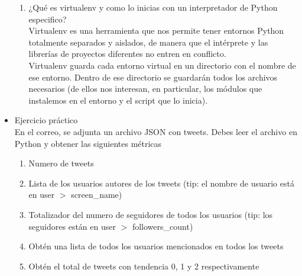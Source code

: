 \documentclass[a4paper,openright,12pt]{report}
\begin{document}
\begin{itemize}
\begin{enumerate}
			\item ¿Qué es virtualenv y como lo inicias con un interpretador de Python especifico?\\
			
			Virtualenv es una herramienta que nos permite tener entornos Python totalmente separados y aislados, de manera que el intérprete y las librerías de proyectos diferentes no entren en conflicto.\\
			
			Virtualenv guarda cada entorno virtual en un directorio con el nombre de ese entorno. Dentro de ese directorio se guardarán todos los archivos necesarios (de ellos nos interesan, en particular, los módulos que instalemos en el entorno y el script que lo inicia).\\
			
			
		\end{enumerate} 
	
		\item Ejercicio práctico\\
		
		
		En el correo, se adjunta un archivo JSON con tweets.
		Debes leer el archivo en Python y obtener las siguientes métricas\\
		
			\begin{enumerate} 
				\item Numero de tweets
				\item Lista de los usuarios autores de los tweets (tip: el nombre de usuario está en user $>$ screen\_name)
				\item Totalizador del numero de seguidores de todos los usuarios (tip: los seguidores están en user $>$ followers\_count)
				\item Obtén una lista de todos los usuarios mencionados en todos los tweets
				\item Obtén el total de tweets con tendencia 0, 1 y 2 respectivamente
			\end{enumerate} 
	\end{itemize} 
	


\end{document}
